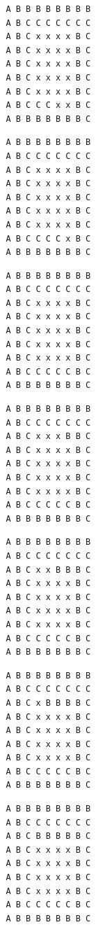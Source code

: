{ \begin{verbatim}
         A B B B B B B B B
         A B C C C C C C C
         A B C x x x x B C
         A B C x x x x B C
         A B C x x x x B C
         A B C x x x x B C
         A B C x x x x B C
         A B C C C x x B C
         A B B B B B B B C
\end{verbatim} }

{ \begin{verbatim}
         A B B B B B B B B
         A B C C C C C C C
         A B C x x x x B C
         A B C x x x x B C
         A B C x x x x B C
         A B C x x x x B C
         A B C x x x x B C
         A B C C C C x B C
         A B B B B B B B C
\end{verbatim} }

{ \begin{verbatim}
         A B B B B B B B B
         A B C C C C C C C
         A B C x x x x B C
         A B C x x x x B C
         A B C x x x x B C
         A B C x x x x B C
         A B C x x x x B C
         A B C C C C C B C
         A B B B B B B B C
\end{verbatim} }

{ \begin{verbatim}
         A B B B B B B B B
         A B C C C C C C C
         A B C x x x B B C
         A B C x x x x B C
         A B C x x x x B C
         A B C x x x x B C
         A B C x x x x B C
         A B C C C C C B C
         A B B B B B B B C
\end{verbatim} }

{ \begin{verbatim}
         A B B B B B B B B
         A B C C C C C C C
         A B C x x B B B C
         A B C x x x x B C
         A B C x x x x B C
         A B C x x x x B C
         A B C x x x x B C
         A B C C C C C B C
         A B B B B B B B C
\end{verbatim} }

{ \begin{verbatim}
         A B B B B B B B B
         A B C C C C C C C
         A B C x B B B B C
         A B C x x x x B C
         A B C x x x x B C
         A B C x x x x B C
         A B C x x x x B C
         A B C C C C C B C
         A B B B B B B B C
\end{verbatim} }

{ \begin{verbatim}
         A B B B B B B B B
         A B C C C C C C C
         A B C B B B B B C
         A B C x x x x B C
         A B C x x x x B C
         A B C x x x x B C
         A B C x x x x B C
         A B C C C C C B C
         A B B B B B B B C
\end{verbatim} }

